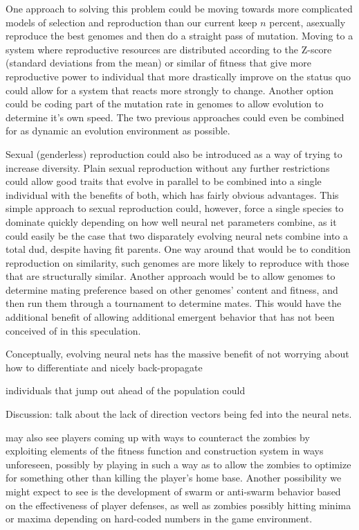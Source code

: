 \documentclass[letterpaper]{article}
\begin{document}
One approach to solving this problem could be moving towards more complicated
models of selection and reproduction than our current keep \(n\) percent,
asexually reproduce the best genomes and then do a straight pass of mutation.
Moving to a system where reproductive resources are distributed according to the
Z-score (standard deviations from the mean) or similar of fitness that give more
reproductive power to individual that more drastically improve on the status quo
could allow for a system that reacts more strongly to change. Another option
could be coding part of the mutation rate in genomes to allow evolution to
determine it's own speed. The two previous approaches could even be combined for
as dynamic an evolution environment as possible.

Sexual (genderless) reproduction could also be introduced as a way of trying to
increase diversity. Plain sexual reproduction without any further restrictions
could allow good traits that evolve in parallel to be combined into a single
individual with the benefits of both, which has fairly obvious advantages.
This simple approach to sexual reproduction could, however, force a single
species to dominate quickly depending on how well neural net parameters combine,
as it could easily be the case that two disparately evolving neural nets combine
into a total dud, despite having fit parents. One way around that would be to
condition reproduction on similarity, such genomes are more likely to reproduce
with those that are structurally similar. Another approach would be to allow
genomes to determine mating preference based on other genomes' content and
fitness, and then run them through a tournament to determine mates. This would
have the additional benefit of allowing additional emergent behavior that has
not been conceived of in this speculation.

Conceptually, evolving neural nets has the massive benefit of not worrying about
how to differentiate and nicely back-propagate

individuals that jump out ahead of the population could

Discussion: talk about the lack of direction vectors being fed into the neural nets.

may also see players coming up with ways to counteract the zombies by exploiting
elements of the fitness function and construction system in ways unforeseen,
possibly by playing in such a way as to allow the zombies to optimize for
something other than killing the player's home base. Another possibility we
might expect to see is the development of swarm or anti-swarm behavior based on
the effectiveness of player defenses, as well as zombies possibly hitting minima
or maxima depending on hard-coded numbers in the game environment.
\end{document}
